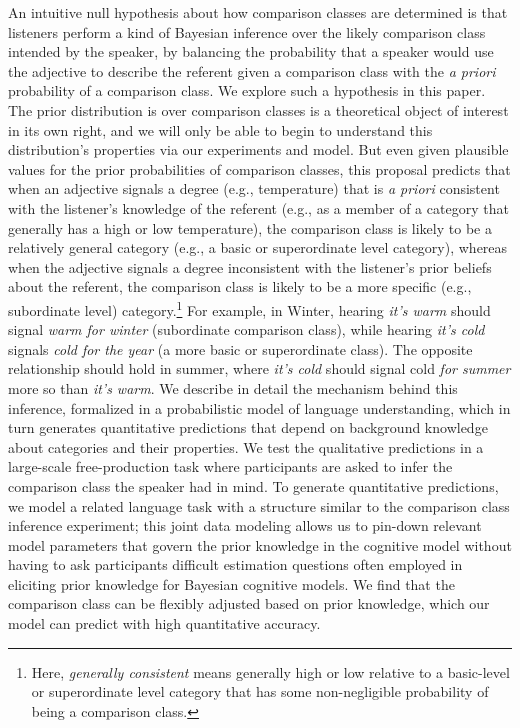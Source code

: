 \documentclass[doc]{apa6}
\begin{document}
An intuitive null hypothesis about how comparison classes are determined is that listeners perform a kind of Bayesian inference over the likely comparison class intended by the speaker, by balancing the probability that a speaker would use the adjective to describe the referent given a comparison class with the \emph{a priori} probability of a comparison class.
We explore such a hypothesis in this paper.
The prior distribution is over comparison classes is a theoretical object of interest in its own right, and we will only be able to begin to understand this distribution's properties via our experiments and model.%
But even given plausible values for the prior probabilities of comparison classes, this proposal predicts that when an adjective signals a degree (e.g., temperature) that is \emph{a priori} consistent with the listener's knowledge of the referent (e.g., as a member of a category that generally has a high or low temperature), the comparison class is likely to be a relatively general category (e.g., a basic or superordinate level category), whereas when the adjective signals a degree inconsistent with the listener's prior beliefs about the referent, the comparison class is likely to be a more specific (e.g., subordinate level) category.\footnote{Here, \emph{generally consistent} means generally high or low relative to a basic-level or superordinate level category that has some non-negligible probability of being a comparison class.}
For example, in Winter, hearing \emph{it's warm} should signal \emph{warm for winter} (subordinate comparison class), while hearing \emph{it's cold} signals \emph{cold for the year} (a more basic or superordinate class). 
The opposite relationship should hold in summer, where \emph{it's cold} should signal cold \emph{for summer} more so than \emph{it's warm}. 
We describe in detail the mechanism behind this inference, formalized in a probabilistic model of language understanding, which in turn generates quantitative predictions that depend on background knowledge about categories and their properties. 
We test the qualitative predictions in a large-scale free-production task where participants are asked to infer the comparison class the speaker had in mind. 
To generate quantitative predictions, we model a related language task with a structure similar to the comparison class inference experiment; this joint data modeling allows us to pin-down relevant model parameters that govern the prior knowledge in the cognitive model without having to ask participants difficult estimation questions often employed in eliciting prior knowledge for Bayesian cognitive models. 
We find that the comparison class can be flexibly adjusted based on prior knowledge, which our model can predict with high quantitative accuracy. 
\end{document}
